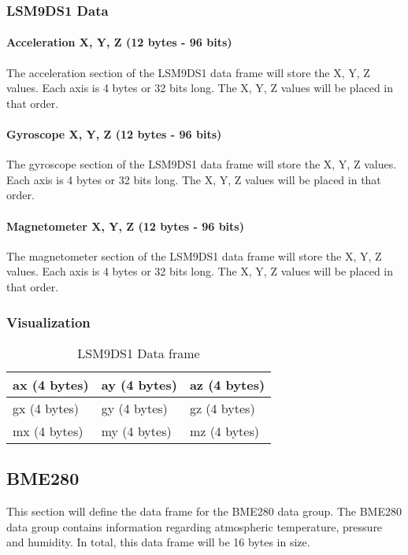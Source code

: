\documentclass{article}
\begin{document}
  \subsubsection{LSM9DS1 Data}
  \paragraph{Acceleration X, Y, Z (12 bytes - 96 bits)}
  The acceleration section of the LSM9DS1 data frame will store the X, Y, Z values. Each axis is 4 bytes or 32 bits long. The X, Y, Z values will be placed in that order.
  \paragraph{Gyroscope X, Y, Z (12 bytes - 96 bits)}
  The gyroscope section of the LSM9DS1 data frame will store the X, Y, Z values. Each axis is 4 bytes or 32 bits long. The X, Y, Z values will be placed in that order.
  \paragraph{Magnetometer X, Y, Z (12 bytes - 96 bits)}
  The magnetometer section of the LSM9DS1 data frame will store the X, Y, Z values. Each axis is 4 bytes or 32 bits long. The X, Y, Z values will be placed in that order.
  \subsubsection{Visualization}
  
  \begin{table}[h]
  \centering
  \caption{LSM9DS1 Data frame}
  \begin{tabular}{|l|l|l|l|l|l|l|l|l|l|l|l|}
  \hline
  \multicolumn{4}{|l|}{ax (4 bytes)} & \multicolumn{4}{l|}{ay (4 bytes)} & \multicolumn{4}{l|}{az (4 bytes)} \\ \hline
  \multicolumn{4}{|l|}{gx (4 bytes)} & \multicolumn{4}{l|}{gy (4 bytes)} & \multicolumn{4}{l|}{gz (4 bytes)} \\ \hline
  \multicolumn{4}{|l|}{mx (4 bytes)} & \multicolumn{4}{l|}{my (4 bytes)} & \multicolumn{4}{l|}{mz (4 bytes)} \\ \hline
  \end{tabular}
  \end{table}

  \subsection{BME280}
  This section will define the data frame for the BME280 data group. The BME280 data group contains information regarding atmospheric temperature, pressure and humidity. In total, this data frame will be 16 bytes in size.
\end{document}

